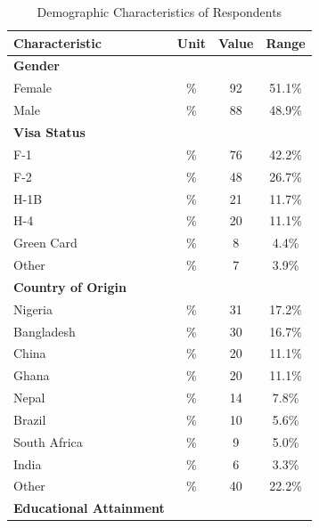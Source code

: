 \begin{table}[H]
\centering
\caption{Demographic Characteristics of Respondents}
\label{tab:demographics}
\begin{tabular}{lccc}
\toprule
Characteristic & Unit & Value & Range \\
\midrule
\textbf{Gender} & & & \\
\hspace{1em}  Female & \% & 92 & 51.1\% \\
\hspace{1em}  Male & \% & 88 & 48.9\% \\
\textbf{Visa Status} & & & \\
\hspace{1em}  F-1 & \% & 76 & 42.2\% \\
\hspace{1em}  F-2 & \% & 48 & 26.7\% \\
\hspace{1em}  H-1B & \% & 21 & 11.7\% \\
\hspace{1em}  H-4 & \% & 20 & 11.1\% \\
\hspace{1em}  Green Card & \% & 8 & 4.4\% \\
\hspace{1em}  Other & \% & 7 & 3.9\% \\
\textbf{Country of Origin} & & & \\
\hspace{1em}  Nigeria & \% & 31 & 17.2\% \\
\hspace{1em}  Bangladesh & \% & 30 & 16.7\% \\
\hspace{1em}  China & \% & 20 & 11.1\% \\
\hspace{1em}  Ghana & \% & 20 & 11.1\% \\
\hspace{1em}  Nepal & \% & 14 & 7.8\% \\
\hspace{1em}  Brazil & \% & 10 & 5.6\% \\
\hspace{1em}  South Africa & \% & 9 & 5.0\% \\
\hspace{1em}  India & \% & 6 & 3.3\% \\
\hspace{1em}  Other & \% & 40 & 22.2\% \\
\textbf{Educational Attainment} & & & \\

\end{tabular}
\end{table}
